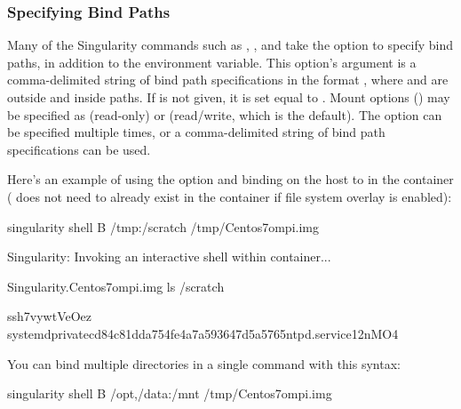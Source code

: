 \documentclass[letterpaper,10pt,english]{sphinxmanual}
\begin{document}
\subsubsection{Specifying Bind Paths}
\label{\detokenize{bind_paths_and_mounts:specifying-bind-paths}}
Many of the Singularity commands such as ,  , and  take the  option to specify bind paths, in addition to the 
environment variable. This option’s argument is a comma-delimited
string of bind path specifications in the format , where  and  are
outside and inside paths. If  is not given, it is set equal to  . Mount
options () may be specified as  (read-only) or  (read/write, which is
the default). The  option can be specified multiple times, or a
comma-delimited string of bind path specifications can be used.

Here’s an example of using the  option and binding  on the host to  in
the container ( does not need to already exist in the container if
file system overlay is enabled):

%
\begin{sphinxVerbatim}[commandchars=\\\{\}]
\PYGZdl{} singularity shell \PYGZhy{}B /tmp:/scratch /tmp/Centos7\PYGZhy{}ompi.img

Singularity: Invoking an interactive shell within container...


Singularity.Centos7\PYGZhy{}ompi.img\PYGZgt{} ls /scratch

ssh\PYGZhy{}7vywtVeOez  systemd\PYGZhy{}private\PYGZhy{}cd84c81dda754fe4a7a593647d5a5765\PYGZhy{}ntpd.service\PYGZhy{}12nMO4
\end{sphinxVerbatim}

You can bind multiple directories in a single command with this
syntax:

%
\begin{sphinxVerbatim}[commandchars=\\\{\}]
\PYGZdl{} singularity shell \PYGZhy{}B /opt,/data:/mnt /tmp/Centos7\PYGZhy{}ompi.img
\end{sphinxVerbatim}
\end{document}

